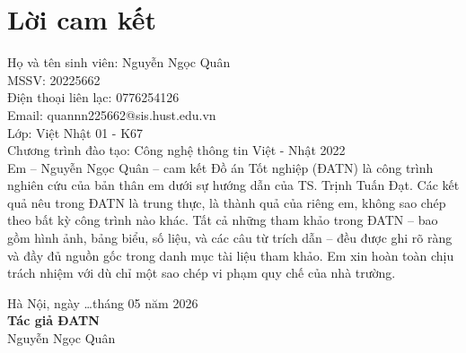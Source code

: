 \documentclass[../DoAn.tex]{subfiles}
\begin{document}
\chapter*{Lời cam kết}

\noindent
Họ và tên sinh viên: Nguyễn Ngọc Quân \\
MSSV: 20225662 \\
Điện thoại liên lạc: 0776254126 \\
Email: quannn225662@sis.hust.edu.vn \\
Lớp: Việt Nhật 01 - K67 \\
Chương trình đào tạo: Công nghệ thông tin Việt - Nhật 2022 \\[1cm]

Em – Nguyễn Ngọc Quân – cam kết Đồ án Tốt nghiệp (ĐATN) là công trình nghiên cứu của bản thân em dưới sự hướng dẫn của TS. Trịnh Tuấn Đạt. Các kết quả nêu trong ĐATN là trung thực, là thành quả của riêng em, không sao chép theo bất kỳ công trình nào khác. Tất cả những tham khảo trong ĐATN – bao gồm hình ảnh, bảng biểu, số liệu, và các câu từ trích dẫn – đều được ghi rõ ràng và đầy đủ nguồn gốc trong danh mục tài liệu tham khảo. Em xin hoàn toàn chịu trách nhiệm với dù chỉ một sao chép vi phạm quy chế của nhà trường.

\vspace{1.5cm}
\begin{flushright}
Hà Nội, ngày \dots tháng 05 năm 2026\\[0.5cm]
\textbf{Tác giả ĐATN}\\[2cm]
Nguyễn Ngọc Quân
\end{flushright}
\end{document}
